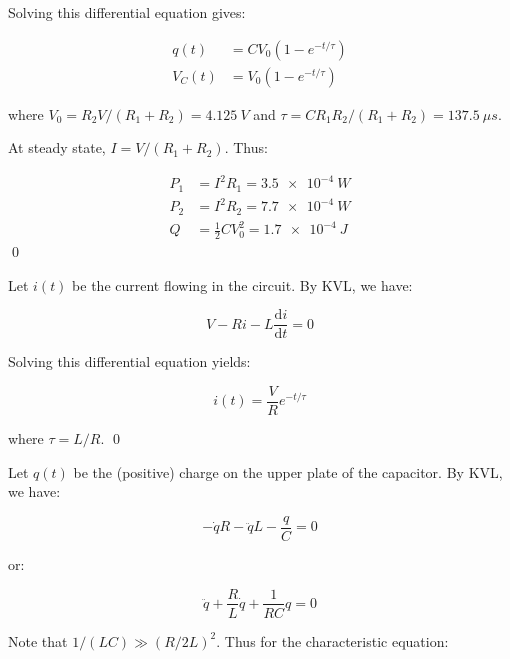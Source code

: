 \documentclass[12pt]{article}
\begin{document}
Solving this differential equation gives:

\begin{equation}
\begin{split}
    q(t) &= CV_{0} (1 - e^{-t/\tau}) \\
    V_{C}(t) &= V_{0} (1 - e^{-t/\tau})
\end{split}
\end{equation}

where $V_{0} = R_{2}V/(R_{1} + R_{2}) = \qty{4.125}{V}$ and $\tau = C R_{1} R_{2}/(R_{1} + R_{2}) = \qty{137.5}{\mu s}$.

At steady state, $I = V/(R_{1} + R_{2})$. Thus:

\begin{equation}
\begin{split}
    P_{1} &= I^{2} R_{1} = \qty{3.5e-4}{W} \\
    P_{2} &= I^{2} R_{2} = \qty{7.7e-4}{W} \\
    Q &= \frac{1}{2} C V_{0}^{2} = \qty{1.7e-4}{J}
\end{split}
\end{equation}
\qed


Let $i(t)$ be the current flowing in the circuit. By KVL, we have:

\begin{equation}
    V - R i - L \frac{\mathrm{d}i}{\mathrm{d}t} = 0
\end{equation}

Solving this differential equation yields:

\begin{equation}
    i(t) = \frac{V}{R} e^{-t/\tau}
\end{equation}

where $\tau = L/R$.
\qed



Let $q(t)$ be the (positive) charge on the upper plate of the capacitor. By KVL, we have:

\begin{equation}
    - \dot{q}R - \ddot{q}L - \frac{q}{C} = 0
\end{equation}

or:

\begin{equation}
    \ddot{q} + \frac{R}{L} \dot{q} + \frac{1}{RC} q = 0
\end{equation}

Note that $1/(LC) \gg (R/2L)^{2}$. Thus for the characteristic equation:
\end{document}
